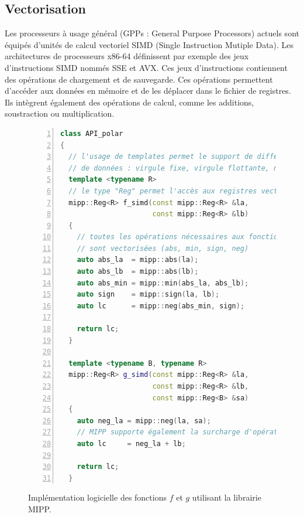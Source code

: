 \subsection{Vectorisation}


Les processeurs à usage général (GPPs : General Purpose Processors) actuels sont équipés d'unités de calcul vectoriel SIMD (Single Instruction Mutiple Data). Les architectures de processeurs x86-64 définissent par exemple des jeux d'instructions SIMD nommés SSE et AVX. Ces jeux d'instructions contiennent des opérations de chargement et de sauvegarde. Ces opérations permettent d'accéder aux données en mémoire et de les déplacer dans le fichier de registres. Ils intègrent également des opérations de calcul, comme les additions, soustraction ou multiplication.
\begin{figure}[htp]
\begin{lstlisting}[language=C++, numbers=left, numbersep=0.3em, tabsize=2, basicstyle=\footnotesize\ttfamily]
class API_polar
{
  // l'usage de templates permet le support de différents formats
  // de données : virgule fixe, virgule flottante, nombre de bits
  template <typename R>
  // le type "Reg" permet l'accès aux registres vectoriels
  mipp::Reg<R> f_simd(const mipp::Reg<R> &la,
                      const mipp::Reg<R> &lb)
  {
    // toutes les opérations nécessaires aux fonctions polaires
    // sont vectorisées (abs, min, sign, neg)
    auto abs_la  = mipp::abs(la);
    auto abs_lb  = mipp::abs(lb);
    auto abs_min = mipp::min(abs_la, abs_lb);
    auto sign    = mipp::sign(la, lb);
    auto lc      = mipp::neg(abs_min, sign);

    return lc;
  }

  template <typename B, typename R>
  mipp::Reg<R> g_simd(const mipp::Reg<R> &la,
                      const mipp::Reg<R> &lb,
                      const mipp::Reg<B> &sa)
  {
    auto neg_la = mipp::neg(la, sa);
    // MIPP supporte également la surcharge d'opérateurs
    auto lc     = neg_la + lb;

    return lc;
  }

  \end{lstlisting}
  \caption{Implémentation logicielle des fonctions $f$ et $g$ utilisant la librairie MIPP.}
  \label{fig:mipp}
  \end{figure}

